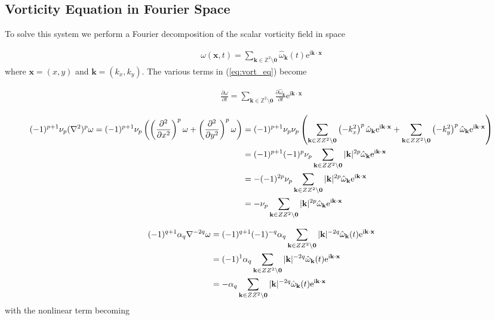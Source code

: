 \documentclass[9pt]{article}
\newcommand{\pder}[2]{\frac{\partial #1}{\partial #2}}               %
\newcommand{\ppder}[2]{\frac{\partial^2 #1}{\partial {#2}^2}}        %
\newcommand{\ii}{\mathrm{i}}      								  %
\newcommand{\e}{\mathrm{e}}      								  %
\newcommand{\omegahat}[1]{\hat{\omega}_{ \mathbf{#1} } }								%
\newcommand{\bfx}{\mathbf{x}}								%
\newcommand{\bfk}{\mathbf{k}}								%
\begin{document}
\subsection{Vorticity Equation in Fourier Space}

To solve this system we perform a Fourier decomposition of the scalar vorticity field in space

\begin{align}
	\omega(\mathbf{x}, t) = \sum_{\mathbf{k}\in \mathbb{Z}^2\setminus \mathbf{0}}\hat{\omega}_{\mathbf{k}}(t)\e^{\ii \mathbf{k}\cdot \mathbf{x}}
	\label{eq:fourier_decomp}
\end{align}
where $\bfx = (x, y)$ and $\bfk = (k_x, k_y)$. The various terms in (\ref{eq:vort_eq}) become

\begin{align}
	\pder{\omega}{t} = \sum_{\bfk \in \mathbb{Z}^2\setminus \mathbf{0}} \pder{\omegahat{k}}{t} \e^{\ii \mathbf{k}\cdot \mathbf{x}}
\end{align}


\begin{align}
	(-1)^{p + 1}\nu_p (\nabla^2)^p  \omega =  (-1)^{p + 1}\nu_p \left(\left(\ppder{}{x}\right)^p\omega + \left(\ppder{}{y}\right)^p\omega\right) &= (-1)^{p + 1}\nu_p \nu_p\left(\sum_{\mathbf{k}\in \mathbb{Z}^2\setminus \mathbf{0}} \left(-k_x^2\right)^p\hat{\omega}_{\mathbf{k}}\e^{\ii \mathbf{k}\cdot \mathbf{x}} +\sum_{\mathbf{k}\in \mathbb{Z}^2\setminus \mathbf{0}} \left(-k_y^2\right)^p\hat{\omega}_{\mathbf{k}}\e^{\ii \mathbf{k}\cdot \mathbf{x}} \right)\notag \\
	&= (-1)^{p + 1}(-1)^p\nu_p\sum_{\mathbf{k}\in \mathbb{Z}^2\setminus \mathbf{0}} |\bfk|^{2p}\hat{\omega}_{\mathbf{k}}\e^{\ii \mathbf{k}\cdot \mathbf{x}} \notag\\
	&= -(-1)^{2p}\nu_p\sum_{\mathbf{k}\in \mathbb{Z}^2\setminus \mathbf{0}} |\bfk|^{2p}\hat{\omega}_{\mathbf{k}}\e^{\ii \mathbf{k}\cdot \mathbf{x}} \notag \\
	&= -\nu_p\sum_{\mathbf{k}\in \mathbb{Z}^2\setminus \mathbf{0}} |\bfk|^{2p}\hat{\omega}_{\mathbf{k}}\e^{\ii \mathbf{k}\cdot \mathbf{x}} 
\end{align}

\begin{align}
	(-1)^{q + 1}\alpha_q \nabla^{-2q}\omega &= (-1)^{q + 1} (-1)^{-q}\alpha_q \sum_{\mathbf{k}\in \mathbb{Z}^2\setminus \mathbf{0}} |\bfk|^{-2q}\hat{\omega}_{\mathbf{k}}(t)\e^{\ii \mathbf{k}\cdot \mathbf{x}} \notag \\
																					&= (-1)^{1}\alpha_q \sum_{\mathbf{k}\in \mathbb{Z}^2\setminus \mathbf{0}} |\bfk|^{-2q}\hat{\omega}_{\mathbf{k}}(t)\e^{\ii \mathbf{k}\cdot \mathbf{x}} \notag \\
																					&= -\alpha_q \sum_{\mathbf{k}\in \mathbb{Z}^2\setminus \mathbf{0}} |\bfk|^{-2q}\hat{\omega}_{\mathbf{k}}(t)\e^{\ii \mathbf{k}\cdot \mathbf{x}}
\end{align}
with the nonlinear term becoming 
\end{document}

